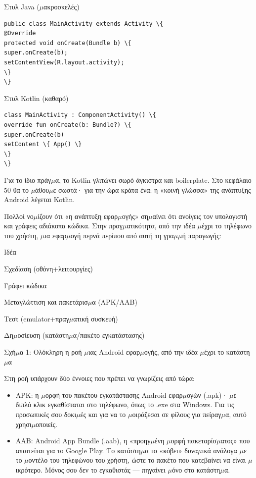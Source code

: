 Στυλ Java ($\mu$ακροσκελές)

\begin{lstlisting}
public class MainActivity extends Activity \{
@Override
protected void onCreate(Bundle b) \{
super.onCreate(b);
setContentView(R.layout.activity);
\}
\}
\end{lstlisting}

Στυλ Kotlin (καθαρό)

\begin{lstlisting}
class MainActivity : ComponentActivity() \{
override fun onCreate(b: Bundle?) \{
super.onCreate(b)
setContent \{ App() \}
\}
\}
\end{lstlisting}

Για το ίδιο πράγ$\mu$α, το Kotlin γλιτώνει σωρό άγκιστρα και boilerplate. Στο κεφάλαιο 50 θα το $\mu$άθου$\mu$ε σωστά· για την ώρα κράτα ένα: η «κοινή γλώσσα» της ανάπτυξης Android λέγεται Kotlin.


Πολλοί νο$\mu$ίζουν ότι «η ανάπτυξη εφαρ$\mu$ογής» ση$\mu$αίνει ότι ανοίγεις τον υπολογιστή και γράφεις αδιάκοπα κώδικα. Στην πραγ$\mu$ατικότητα, από την ιδέα $\mu$έχρι το τηλέφωνο του χρήστη, $\mu$ια εφαρ$\mu$ογή περνά περίπου από αυτή τη γρα$\mu$$\mu$ή παραγωγής:

Ιδέα

Σχεδίαση (οθόνη+λειτουργίες)

Γράφει κώδικα

Μεταγλώττιση και πακετάρισ$\mu$α (APK/AAB)

Τεστ (emulator+πραγ$\mu$ατική συσκευή)

Δη$\mu$οσίευση (κατάστη$\mu$α/πακέτο εγκατάστασης)

\begin{center}\small\color{gray}Σχή$\mu$α 1: Ολόκληρη η ροή $\mu$ιας Android εφαρ$\mu$ογής, από την ιδέα $\mu$έχρι το κατάστη$\mu$α\end{center}

Στη ροή υπάρχουν δύο έννοιες που πρέπει να γνωρίζεις από τώρα:

\begin{itemize}
  \item APK: η $\mu$ορφή του πακέτου εγκατάστασης Android εφαρ$\mu$ογών (.apk)· $\mu$ε διπλό κλικ εγκαθίσταται στο τηλέφωνο, όπως το .exe στα Windows. Για τις προσωπικές σου δοκι$\mu$ές και για να το $\mu$οιράζεσαι σε φίλους για πείραγ$\mu$α, αυτό χρησι$\mu$οποιείς.
  \item AAB: Android App Bundle (.aab), η «προηγ$\mu$ένη $\mu$ορφή πακεταρίσ$\mu$ατος» που απαιτείται για το Google Play. Το κατάστη$\mu$α το «κόβει» δυνα$\mu$ικά ανάλογα $\mu$ε το $\mu$οντέλο του τηλεφώνου του χρήστη, ώστε το πακέτο που κατεβαίνει να είναι $\mu$ικρότερο. Μόνος σου δεν το εγκαθιστάς — πηγαίνει $\mu$όνο στο κατάστη$\mu$α.
\end{itemize}

